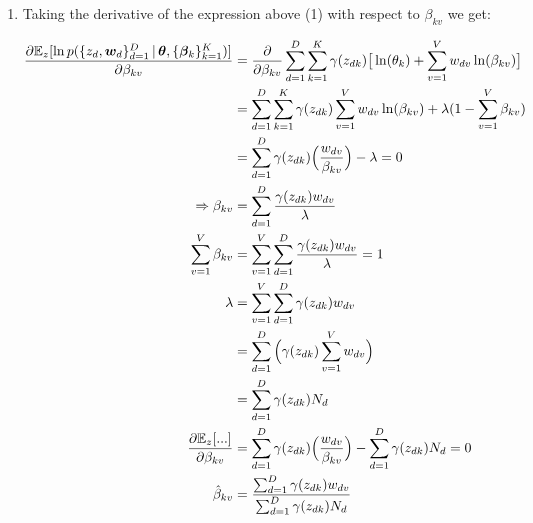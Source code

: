 \documentclass[submit]{harvardml}
\begin{document}
\begin{enumerate}[label=(\alph*)]
	\item Taking the derivative of the expression above (1) with respect to $\beta_{kv}$ we get:
	
	\begin{align*}
	\frac{\partial \mathbb{E}_z [\ln p(\{z_d,\boldsymbol{w}_d\}^D_{d=1}\,|\,\boldsymbol{\theta}, \{\boldsymbol{\beta}_k\}^K_{k=1})]}{\partial \beta_{kv}} 
	& = \frac{\partial}{\partial \beta_{kv}} \sum_{d=1}^{D} \sum_{k=1}^{K}  \gamma(z_{dk}) \big[\ln (\theta_k) + \sum_{v=1}^{V} w_{dv} \ln (\beta_{kv}) \big] \\
	& = \sum_{d=1}^{D} \sum_{k=1}^{K}  \gamma(z_{dk}) \sum_{v=1}^{V} w_{dv} \ln (\beta_{kv}) + \lambda (1-\sum_{v=1}^{V} \beta_{kv}) \\
	& = \sum_{d=1}^{D} \gamma(z_{dk}) \Big( \frac{w_{dv}}{\beta_{kv}} \Big) - \lambda = 0 \\
	\Rightarrow \beta_{kv} & = \sum_{d=1}^{D} \frac{\gamma(z_{dk})w_{dv}}{\lambda} \\
	\sum_{v=1}^{V} \beta_{kv} & = \sum_{v=1}^{V} \sum_{d=1}^{D} \frac{\gamma(z_{dk})w_{dv}}{\lambda} = 1 \\
	\lambda & =  \sum_{v=1}^{V} \sum_{d=1}^{D} \gamma(z_{dk})w_{dv} \\
	& = \sum_{d=1}^{D} \Big( \gamma(z_{dk}) \sum_{v=1}^{V} w_{dv}  \Big) \\
	& = \sum_{d=1}^{D} \gamma(z_{dk}) N_d  \\
	\frac{\partial \mathbb{E}_z [...]}{\partial \beta_{kv}}
	& = \sum_{d=1}^{D} \gamma(z_{dk}) \Big(\frac{w_{dv}}{\beta_{kv}} \Big) - \sum_{d=1}^{D} \gamma(z_{dk}) N_d = 0 \\
	\hat{\beta}_{kv} & = \frac{\sum_{d=1}^{D}\gamma(z_{dk})w_{dv}}{\sum_{d=1}^{D} \gamma(z_{dk}) N_d}
	\end{align*}
	
	
\end{enumerate}



\newpage
\end{document}
